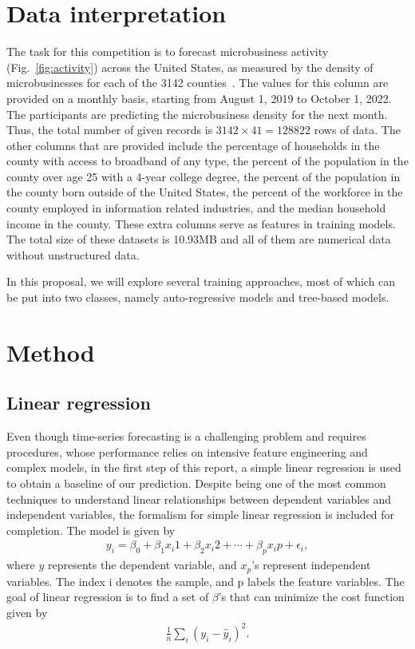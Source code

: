 \documentclass[prl,aps,superscriptaddress,twocolumn,10pt,nolongbibliography]{revtex4-2}
\begin{document}
\section{Data interpretation}
The task for this competition is to forecast microbusiness activity (Fig.~\ref{fig:activity}) across the United States, as measured by the density of microbusinesses for each of the 3142 counties~\cite{yu2021godaddy}.
The values for this column are provided on a monthly basis, starting from August 1, 2019 to October 1, 2022. 
The participants are predicting the microbusiness density for the next month. 
Thus, the total number of given records is $3142 \times 41 = 128822$ rows of data.
The other columns that are provided include the percentage of households in the county with access to broadband of any type, the percent of the population in the county over age 25 with a 4-year college degree, the percent of the population in the county born outside of the United States, the percent of the workforce in the county employed in information related industries, and the median household income in the county. 
These extra columns serve as features in training models.
The total size of these datasets is 10.93MB and all of them are numerical data without unstructured data. 

In this proposal, we will explore several training approaches, most of which can be put into two classes, namely auto-regressive models and tree-based models. 

\section{Method}

\subsection{Linear regression}
Even though time-series forecasting is a challenging problem and requires procedures, whose performance relies on intensive feature engineering and complex models, in the first step of this report, a simple linear regression is used to obtain a baseline of our prediction. 
Despite being one of the most common techniques to understand linear relationships between dependent variables and independent variables, the formalism for simple linear regression is included for completion. 
The model is given by 
\begin{align}
y_i = \beta_0 + \beta_1 x_i1 + \beta_2 x_i2 + \cdots + \beta_p x_ip + \epsilon_i, 
\end{align}
where $y$ represents the dependent variable, and $x_p$'s represent independent variables. 
The index i denotes the sample, and p labels the feature variables. The goal of linear regression is to find a set of $\beta$'s that can minimize the cost function given by 
\begin{align}
\frac{1}{n} \sum_i (y_{i} - \hat{y}_{i})^2.
\end{align}
\end{document}
